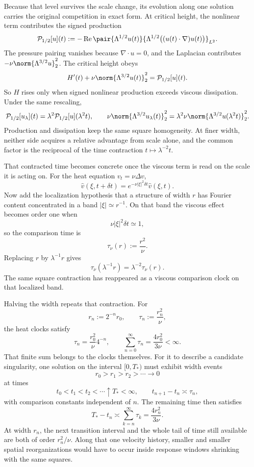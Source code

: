 
Because that level survives the scale change, its evolution along one solution carries the original competition in exact form. At critical height, the nonlinear term contributes the signed production
\[
  \mathcal P_{1/2}[u](t)
  :=
  -\operatorname{Re}
  \pair
    {\Lambda^{1/2}u(t)}
    {\Lambda^{1/2}\bigl((u(t)\cdot\nabla)u(t)\bigr)}_{L^2}.
\]
The pressure pairing vanishes because \(\nabla\cdot u=0\), and the Laplacian contributes \(-\nu\norm{\Lambda^{3/2}u}_2^2\). The critical height obeys
\[
  H'(t)
  +
  \nu\norm{\Lambda^{3/2}u(t)}_2^2
  =
  \mathcal P_{1/2}[u](t).
\]
So \(H\) rises only when signed nonlinear production exceeds viscous dissipation. Under the same rescaling,
\[
  \mathcal P_{1/2}[u_\lambda](t)
  =
  \lambda^2\mathcal P_{1/2}[u](\lambda^2t),
  \qquad
  \nu\norm{\Lambda^{3/2}u_\lambda(t)}_2^2
  =
  \lambda^2\nu\norm{\Lambda^{3/2}u(\lambda^2t)}_2^2.
\]
Production and dissipation keep the same square homogeneity. At finer width, neither side acquires a relative advantage from scale alone, and the common factor is the reciprocal of the time contraction \(t\mapsto\lambda^{-2}t\).


That contracted time becomes concrete once the viscous term is read on the scale it is acting on. For the heat equation \(v_t=\nu\Delta v\),
\[
  \widehat v(\xi,t+\delta t)
  =
  e^{-\nu|\xi|^2\delta t}\widehat v(\xi,t).
\]
Now add the localization hypothesis that a structure of width \(r\) has Fourier content concentrated in a band \(|\xi|\simeq r^{-1}\). On that band the viscous effect becomes order one when
\[
  \nu|\xi|^2\delta t\simeq1,
\]
so the comparison time is
\[
  \tau_\nu(r)
  :=
  \frac{r^2}{\nu}.
\]
Replacing \(r\) by \(\lambda^{-1}r\) gives
\[
  \tau_\nu(\lambda^{-1}r)
  =
  \lambda^{-2}\tau_\nu(r).
\]
The same square contraction has reappeared as a viscous comparison clock on that localized band.


Halving the width repeats that contraction. For
\[
  r_n:=2^{-n}r_0,
  \qquad
  \tau_n:=\frac{r_n^2}{\nu},
\]
the heat clocks satisfy
\[
  \tau_n
  =
  \frac{r_0^2}{\nu}4^{-n},
  \qquad
  \sum_{n=0}^{\infty}\tau_n
  =
  \frac{4r_0^2}{3\nu}
  <
  \infty.
\]
That finite sum belongs to the clocks themselves. For it to describe a candidate singularity, one \NavierStokes{} solution on the interval \([0,T_*)\) must exhibit width events
\[
  r_0>r_1>r_2>\cdots\longrightarrow0
\]
at times
\[
  t_0<t_1<t_2<\cdots\uparrow T_*<\infty,
  \qquad
  t_{n+1}-t_n\asymp\tau_n,
\]
with comparison constants independent of \(n\). The remaining time then satisfies
\[
  T_*-t_n
  \asymp
  \sum_{k=n}^{\infty}\tau_k
  =
  \frac{4r_n^2}{3\nu}.
\]
At width \(r_n\), the next transition interval and the whole tail of time still available are both of order \(r_n^2/\nu\). Along that one velocity history, smaller and smaller spatial reorganizations would have to occur inside response windows shrinking with the same squares.
